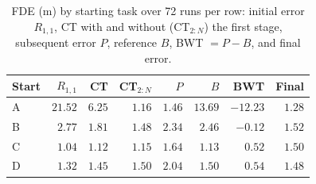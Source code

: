 \begin{table}[!t]
\centering
\caption{FDE (m) by starting task over 72 runs per row: initial error $R_{1,1}$, CT with and without (CT$_{2:N}$) the first stage, subsequent error $P$, reference $B$, BWT $=P-B$, and final error.}
\label{tab:bwt_diagnostic}
\setlength{\tabcolsep}{2.5pt}
\footnotesize
\begin{tabular*}{\columnwidth}{@{\extracolsep{\fill}}lrrrrrrr@{}}
\toprule
Start & $R_{1,1}$ & CT & CT$_{2:N}$ & $P$ & $B$ & BWT & Final \\
\midrule
A & $21.52$ & $6.25$ & $1.16$ & $1.46$ & $13.69$ & $-12.23$ & $1.28$ \\
B & $2.77$ & $1.81$ & $1.48$ & $2.34$ & $2.46$ & $-0.12$ & $1.52$ \\
C & $1.04$ & $1.12$ & $1.15$ & $1.64$ & $1.13$ & $0.52$ & $1.50$ \\
D & $1.32$ & $1.45$ & $1.50$ & $2.04$ & $1.50$ & $0.54$ & $1.48$ \\
\bottomrule
\end{tabular*}
\end{table}

